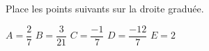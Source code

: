 %
%
  Place les points suivants sur la droite graduée.
  \begin{center}
    $A=\dfrac{2}{7}$
    \hfil $B=\dfrac{3}{21}$
    \hfil $C=\dfrac{-1}{7}$
    \hfil $D=\dfrac{-12}{7}$
    \hfil $E=2$
    \medbreak
    
  \end{center}
